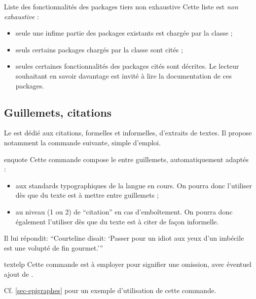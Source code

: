 \begin{dbwarning}{Liste des fonctionnalités des packages tiers non exhaustive}{}
  Cette liste est \emph{non exhaustive} :
  \begin{itemize}
  \item seule une infime partie des packages existants est chargée par la
    classe ;
  \item seuls certains packages chargés par la classe sont cités ;
  \item seules certaines fonctionnalités des packages cités sont décrites. Le
    lecteur souhaitant en savoir davantage est invité à lire la documentation de
    ces packages.
  \end{itemize}
\end{dbwarning}

\subsection{Guillemets, citations}
\label{sec:guillemets-citations}

Le  est dédié aux citations, formelles et informelles,
d'extraits de textes. Il propose notamment la commande 
suivante, simple d'emploi.

\begin{docCommand}{enquote}{}
  Cette commande compose le  entre guillemets, automatiquement
  adaptés :
  \begin{itemize}
  \item aux standards typographiques de la langue en cours. On pourra donc
    l'utiliser dès que du texte est à mettre entre guillemets ;
  \item au niveau (1 ou 2) de \enquote{citation} en cas d'emboîtement. On
    pourra donc également l'utiliser dès que du texte est à citer de façon
    informelle.
  \end{itemize}
\begin{bodycode}
Il lui répondit: \enquote{Courteline disait: \enquote{Passer pour un idiot aux
    yeux d'un imbécile est une volupté de fin gourmet.}}
\end{bodycode}
\end{docCommand}

\begin{docCommand}{textelp}{}
  Cette commande est à employer pour signifier une omission, avec éventuel ajout
  de .

  Cf. \vref{sec-epigraphes} pour un exemple d'utilisation de cette commande.
\end{docCommand}

